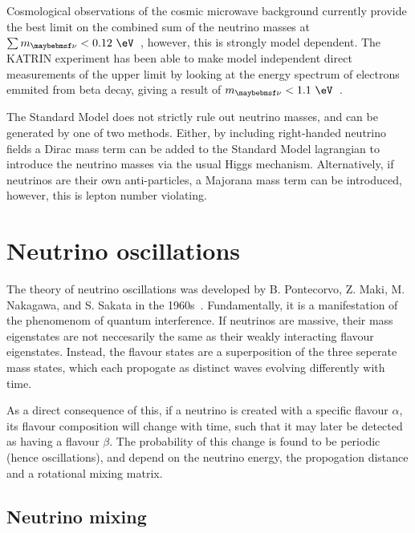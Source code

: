 Cosmological observations of the cosmic microwave background currently provide the best limit on
the combined sum of the neutrino masses at $\sum m_{\nu} < 0.12~\eV$~\cite{planck2018}, however,
this is strongly model dependent. The KATRIN experiment has been able to make model independent
direct measurements of the upper limit by looking at the energy spectrum of electrons emmited
from beta decay, giving a result of $m_{\nu} < 1.1~\eV$~\cite{aker2019}.

The Standard Model does not strictly rule out neutrino masses, and can be generated by one
of two methods. Either, by including right-handed neutrino fields a Dirac mass term can be added
to the Standard Model lagrangian to introduce the neutrino masses via the usual Higgs mechanism.
Alternatively, if neutrinos are their own anti-particles, a Majorana mass term can be introduced,
however, this is lepton number violating.

\section{Neutrino oscillations}
\label{sec:theory_oscillations}

The theory of neutrino oscillations was developed by B. Pontecorvo, Z. Maki, M. Nakagawa, and
S. Sakata in the 1960s~\cite{maki1962, pontecorvo1967, pontecorvo1969}. Fundamentally, it is a
manifestation of the phenomenom of quantum interference. If neutrinos are massive, their mass
eigenstates are not neccesarily the same as their weakly interacting flavour eigenstates. Instead,
the flavour states are a superposition of the three seperate mass states, which each propogate as
distinct waves evolving differently with time.

As a direct consequence of this, if a neutrino is created with a specific flavour $\alpha$, its
flavour composition will change with time, such that it may later be detected as having a flavour
$\beta$. The probability of this change is found to be periodic (hence oscillations), and depend
on the neutrino energy, the propogation distance and a rotational mixing matrix.

\subsection{Neutrino mixing}

